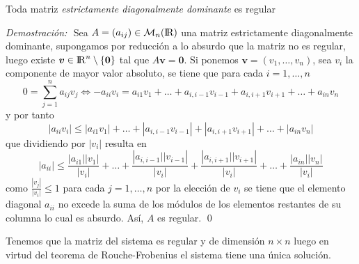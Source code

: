 \documentclass[12pt]{article}
\newenvironment{demostracion}{\noindent\textit{Demostración: } $ $ \newline }{\newline\qed}
\newcommand{\RR}{\rm I\!R}
\newcommand{\abs}[1]{\left|#1\right|}
\begin{document}
\newpage
\begin{lema}
	Toda matriz \textit{estrictamente diagonalmente dominante} es regular
\end{lema}

\begin{demostracion}
	Sea $A = (a_{ij})\in \mathcal{M}_n(\RR)$ una matriz estrictamente diagonalmente dominante, supongamos por reducción a lo absurdo que la matriz no es regular, luego existe $\bm{v} \in {\RR}^n\setminus\{\bm{0}\}$ tal que $A\bm{v} = \bm{0}$. Si ponemos $\bm{v} = (v_1, \dots, v_n)$, sea $v_i$ la componente de mayor valor absoluto, se tiene que para cada $i = 1,\dots,n$
	$$0 = \sum_{j = 1}^{n} a_{ij} v_j \iff -a_{ii} v_i = a_{i1} v_1 +\dots + a_{i, i-1}v_{i-1} + a_{i, i+1}v_{i+1} + \dots + a_{in} v_n$$
	y por tanto
	$$\abs{a_{ii} v_i} \leq \abs{a_{i1} v_1} +\dots + \abs{a_{i, i-1}v_{i-1}} + \abs{a_{i, i+1}v_{i+1}} + \dots + \abs{ a_{in} v_n}$$
	que dividiendo por $\abs{v_i}$ resulta en
	$$\abs{a_{ii}} \leq \frac{\abs{a_{i1} || v_1}}{\abs{v_i}} +\dots + \frac{\abs{a_{i, i-1} || v_{i-1}}}{\abs{v_i}} + \frac{\abs{a_{i, i+1}||v_{i+1}}}{\abs{v_i}} + \dots + \frac{\abs{ a_{in}|| v_n}}{\abs{v_i}}$$
	como $\frac{\abs{v_j}}{\abs{v_i}} \leq 1$ para cada $j=1,\dots, n$ por la elección de $v_i$ se tiene que el elemento diagonal $a_{ii}$ no excede la suma de los módulos de los elementos restantes de su columna lo cual es absurdo. Así, $A$ es regular.
\end{demostracion}

Tenemos que la matriz del sistema es regular y de dimensión $n\times n$ luego en virtud del teorema de Rouche-Frobenius el sistema tiene una única solución.
\end{document}
